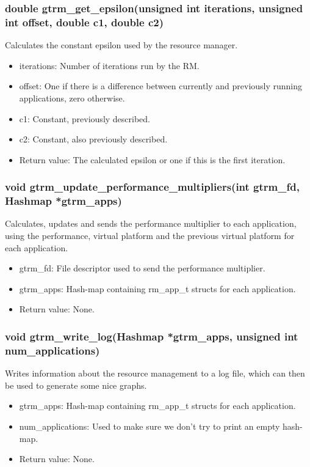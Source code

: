 \documentclass[nobiblatex]{LTHthesis}
\begin{document}
\subsubsection{double gtrm\_get\_epsilon(unsigned int iterations, unsigned int offset, double c1, double c2)}
Calculates the constant epsilon used by the resource manager.
\begin{itemize} 
\item iterations: Number of iterations run by the RM.
\item offset: One if there is a difference between currently and previously running applications, zero otherwise.
\item c1: Constant, previously described.
\item c2: Constant, also previously described.
\item Return value: The calculated epsilon or one if this is the first iteration.
\end{itemize}

\subsubsection{void gtrm\_update\_performance\_multipliers(int gtrm\_fd, Hashmap *gtrm\_apps)}
Calculates, updates and sends the performance multiplier to each application, using the performance, virtual platform and the previous virtual platform for each application.
\begin{itemize} 
\item gtrm\_fd: File descriptor used to send the performance multiplier.
\item gtrm\_apps: Hash-map containing rm\_app\_t structs for each application.
\item Return value: None.
\end{itemize}

\subsubsection{void gtrm\_write\_log(Hashmap *gtrm\_apps, unsigned int num\_applications)}
Writes information about the resource management to a log file, which can then be used to generate some nice graphs.
\begin{itemize} 
\item gtrm\_apps: Hash-map containing rm\_app\_t structs for each application.
\item num\_applications: Used to make sure we don't try to print an empty hash-map.
\item Return value: None.
\end{itemize}
\end{document}
